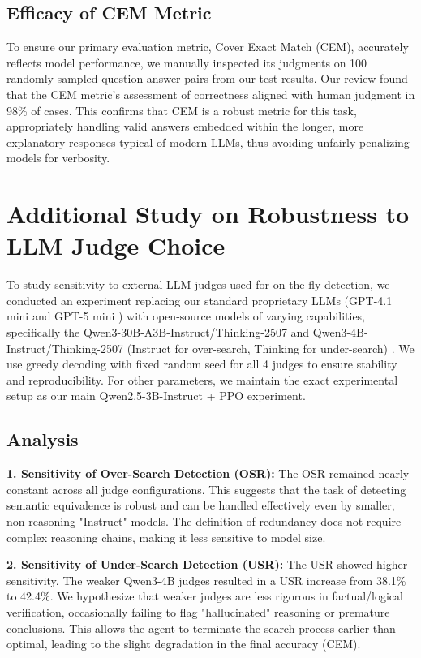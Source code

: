 \documentclass{article}
\begin{document}
\subsection{Efficacy of CEM Metric}
To ensure our primary evaluation metric, Cover Exact Match (CEM), accurately reflects model performance, we manually inspected its judgments on 100 randomly sampled question-answer pairs from our test results. Our review found that the CEM metric’s assessment of correctness aligned with human judgment in 98\% of cases. This confirms that CEM is a robust metric for this task, appropriately handling valid answers embedded within the longer, more explanatory responses typical of modern LLMs, thus avoiding unfairly penalizing models for verbosity.

\section{Additional Study on Robustness to LLM Judge Choice}
To study sensitivity to external LLM judges used for on-the-fly detection, we conducted an experiment replacing our standard proprietary LLMs (GPT-4.1 mini and GPT-5 mini ) with open-source models of varying capabilities, specifically the Qwen3-30B-A3B-Instruct/Thinking-2507 and Qwen3-4B-Instruct/Thinking-2507 (Instruct for over-search, Thinking for under-search) . We use greedy decoding with fixed random seed for all 4 judges to ensure stability and reproducibility. For other parameters, we maintain the exact experimental setup as our main Qwen2.5-3B-Instruct + PPO experiment.


\subsection{Analysis}
\textbf{1. Sensitivity of Over-Search Detection (OSR):} The OSR remained nearly constant across all judge configurations. This suggests that the task of detecting semantic equivalence is robust and can be handled effectively even by smaller, non-reasoning "Instruct" models. The definition of redundancy does not require complex reasoning chains, making it less sensitive to model size.

\textbf{2. Sensitivity of Under-Search Detection (USR):} The USR showed higher sensitivity. The weaker Qwen3-4B judges resulted in a USR increase from 38.1\% to 42.4\%. We hypothesize that weaker judges are less rigorous in factual/logical verification, occasionally failing to flag "hallucinated" reasoning or premature conclusions. This allows the agent to terminate the search process earlier than optimal, leading to the slight degradation in the final accuracy (CEM).
\end{document}
